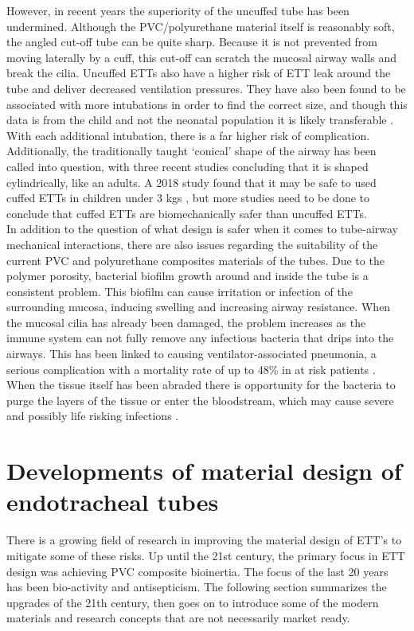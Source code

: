 \documentclass[12pt, openany, oneside]{book}
\begin{document}
However, in recent years the superiority of the uncuffed tube has been undermined. Although the PVC/polyurethane material itself is reasonably soft, the angled cut-off tube can be quite sharp. Because it is not prevented from moving laterally by a cuff, this cut-off can scratch the mucosal airway walls and break the cilia. Uncuffed ETTs also have a higher risk of  ETT leak around the tube and deliver decreased ventilation pressures. They have also been found to be associated with more intubations in order to find the correct size, and though this data is from the child and not the neonatal population it is likely transferable \citep{thomas2016cuffed}. With each additional intubation, there is a far higher risk of complication. Additionally, the traditionally taught `conical' shape of the airway has been called into question, with three recent studies concluding that it is shaped cylindrically, like an adults. A 2018 study found that it may be safe to used cuffed ETTs in children under 3 kgs \citep{thomas2018cuffed}, but more studies need to be done to conclude that cuffed ETTs are biomechanically safer than uncuffed ETTs.\\

In addition to the question of what design is safer when it comes to tube-airway mechanical interactions, there are also issues regarding the suitability of the current PVC and polyurethane composites materials of the tubes. Due to the polymer porosity, bacterial biofilm growth around and inside the tube is a consistent problem. This biofilm can cause irritation or infection of the surrounding mucosa, inducing swelling and increasing airway resistance. When the mucosal cilia has already been damaged, the problem increases as the immune system can not fully remove any infectious bacteria that drips into the airways. This has been linked to causing ventilator-associated pneumonia, a serious complication with a mortality rate of up to 48{\%} in at risk patients \citep{luo2010antimicrobial}. When the tissue itself has been abraded there is opportunity for the bacteria to purge the layers of the tissue or enter the bloodstream, which may cause severe and possibly life risking infections \citep{zur2004electron}.\\



\section{Developments of material design of endotracheal tubes}
There is a growing field of research in improving the material design of ETT's to mitigate some of these risks. Up until the 21st century, the primary focus in ETT design was achieving PVC composite bioinertia. The focus of the last 20 years has been bio-activity and antisepticism. The following section summarizes the upgrades of the 21th century, then goes on to introduce some of the modern materials and research concepts that are not necessarily market ready.
\end{document}
